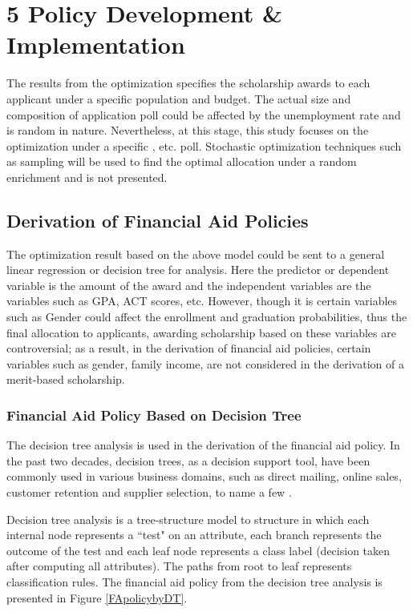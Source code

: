 \documentclass[12pt,english]{report}
\begin{document}

\chapter{5 Policy Development \& Implementation}
The results from the optimization specifies the scholarship awards to each applicant under a specific population and budget.  The actual size and composition of application poll could be affected by the unemployment rate and is random in nature.  Nevertheless, at this stage, this study focuses on the optimization under a specific , etc. poll.  Stochastic optimization techniques such as sampling will be used to find the optimal allocation under a random enrichment and is not presented. 

\section{Derivation of Financial Aid Policies}
 The optimization result based on the above model could be sent to a general linear regression or decision tree for analysis.  Here the predictor or dependent variable is the amount of the award and the independent variables are the variables such as GPA, ACT scores, etc.  However, though it is certain variables such as Gender could affect the enrollment and graduation probabilities, thus the final allocation to applicants, awarding scholarship based on these variables are controversial; as a result, in the derivation of financial aid policies, certain variables such as gender, family  income, are not considered in the derivation of a merit-based scholarship.  

 \subsection{Financial Aid Policy Based on Decision Tree }
 The decision tree analysis is used in the derivation of the financial aid policy.  In the past two decades, decision trees, as a decision support tool,  have been commonly used in various business domains, such as direct mailing, online sales, customer retention and supplier selection, to name a few \citep{han2011data}.  

Decision tree analysis is a tree-structure model to structure  in which each internal node represents a ``test" on an attribute, each branch represents the outcome of the test and each leaf node represents a class label (decision taken after computing all attributes). The paths from root to leaf represents classification rules.  The financial aid policy from the decision tree analysis is presented in Figure \ref{FApolicybyDT}. 
 
\end{document}

